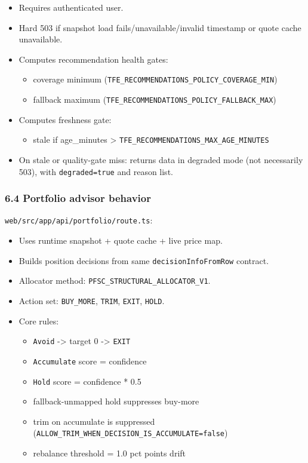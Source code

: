 \documentclass[
]{article}
\providecommand{\tightlist}{%
  \setlength{\itemsep}{0pt}\setlength{\parskip}{0pt}}
\begin{document}
\begin{itemize}
\tightlist
\item
  Requires authenticated user.
\item
  Hard 503 if snapshot load fails/unavailable/invalid timestamp or quote
  cache unavailable.
\item
  Computes recommendation health gates:

  \begin{itemize}
  \tightlist
  \item
    coverage minimum
    (\texttt{TFE\_RECOMMENDATIONS\_POLICY\_COVERAGE\_MIN})
  \item
    fallback maximum
    (\texttt{TFE\_RECOMMENDATIONS\_POLICY\_FALLBACK\_MAX})
  \end{itemize}
\item
  Computes freshness gate:

  \begin{itemize}
  \tightlist
  \item
    stale if age\_minutes \textgreater{}
    \texttt{TFE\_RECOMMENDATIONS\_MAX\_AGE\_MINUTES}
  \end{itemize}
\item
  On stale or quality-gate miss: returns data in degraded mode (not
  necessarily 503), with \texttt{degraded=true} and reason list.
\end{itemize}

\subsubsection{6.4 Portfolio advisor
behavior}\label{64-portfolio-advisor-behavior}

\texttt{web/src/app/api/portfolio/route.ts}:

\begin{itemize}
\tightlist
\item
  Uses runtime snapshot + quote cache + live price map.
\item
  Builds position decisions from same \texttt{decisionInfoFromRow}
  contract.
\item
  Allocator method: \texttt{PFSC\_STRUCTURAL\_ALLOCATOR\_V1}.
\item
  Action set: \texttt{BUY\_MORE}, \texttt{TRIM}, \texttt{EXIT},
  \texttt{HOLD}.
\item
  Core rules:

  \begin{itemize}
  \tightlist
  \item
    \texttt{Avoid} -\textgreater{} target 0 -\textgreater{}
    \texttt{EXIT}
  \item
    \texttt{Accumulate} score = confidence
  \item
    \texttt{Hold} score = confidence * 0.5
  \item
    fallback-unmapped hold suppresses buy-more
  \item
    trim on accumulate is suppressed
    (\texttt{ALLOW\_TRIM\_WHEN\_DECISION\_IS\_ACCUMULATE=false})
  \item
    rebalance threshold = 1.0 pct points drift
  \end{itemize}
\end{itemize}
\end{document}
